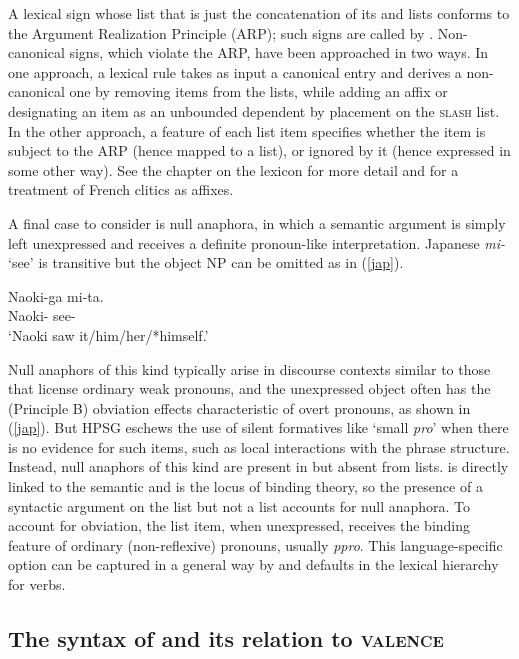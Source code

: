 \documentclass[output=paper]{langsci/langscibook}
\begin{document}
A lexical sign whose \argst list that is just the concatenation of its \subj and \comps lists conforms to the Argument Realization Principle (ARP); such signs are called  by \citet{Boumaetal2001}.  Non-canonical signs, which violate the ARP, have been approached in two ways.  In one approach, a lexical rule takes as input a canonical entry and derives a non-canonical one by removing items from the \val lists, while adding an affix or designating an item as an unbounded dependent by placement on the \textsc{slash} list.  
In the other approach, a feature of each \argst list item specifies whether the item is subject to the ARP (hence mapped to a \val list), or ignored by it (hence expressed in some other way).  
See the chapter on the lexicon for more detail and \citet{MillerandSag1997} for a treatment of French clitics as affixes. 

A final case to consider is null anaphora, in which a semantic argument is simply left unexpressed and receives a definite pronoun-like interpretation.  Japanese \textit{mi-} `see' is transitive but the object NP can be omitted as in (\ref{jap}).

\begin{exe}
	\ex\label{jap}
		\gll Naoki-ga mi-ta.  \\
		Naoki- see-  \\
		\glt `Naoki saw it/him/her/*himself.'
\end{exe} 

\noindent
Null anaphors of this kind typically arise in discourse contexts similar to those that license ordinary weak pronouns, and the unexpressed object often has the (Principle B) obviation effects characteristic of overt pronouns, as shown in (\ref{jap}).  But HPSG eschews the use of silent formatives like `small \textit{pro}' when there is no evidence for such items, such as local interactions with the phrase structure.  Instead, null anaphors of this kind are present in \argst but absent from \val lists.  \argst is directly linked to the semantic \content and is the locus of binding theory, so the presence of a syntactic argument on the \argst list but not a \val list
 accounts for null anaphora.  To account for obviation, the \argst list item, when unexpressed, receives the binding feature of ordinary (non-reflexive) pronouns, usually \textit{ppro}.  This language-specific option can be captured in a general way by \val and \argst defaults in the lexical hierarchy for verbs.   

\subsection{The syntax of \argst and its relation to \textsc{valence}}
\label{argst-sec}
\end{document}
